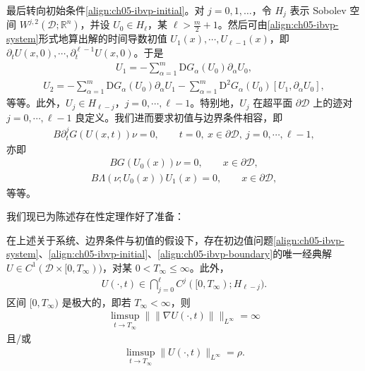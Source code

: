\documentclass[../../main.tex]{subfiles}
\begin{document}
最后转向初始条件\eqref{align:ch05-ibvp-initial}。对 $j=0,1,\ldots$，令 $H_{j}$ 表示 Sobolev 空间 $W^{j,2}(\mathscr{D};\mathbb{R}^{n})$，并设 $U_{0}\in H_{\ell}$，某 $\ell>\frac{m}{2}+1$。然后可由\eqref{align:ch05-ibvp-system}形式地算出解的时间导数初值 $U_{1}(x),\cdots,U_{\ell-1}(x)$，即 $\partial_{t}U(x,0),\cdots,\partial_{t}^{\ell-1}U(x,0)$。于是
\begin{align}
U_{1}=-\sum_{\alpha=1}^{m}\mathrm{D}G_{\alpha}(U_{0})\partial_{\alpha}U_{0},\label{align:ch05-U1}
\end{align}
\begin{align}
U_{2}=-\sum_{\alpha=1}^{m}\mathrm{D}G_{\alpha}(U_{0})\partial_{\alpha}U_{1}-\sum_{\alpha=1}^{m}\mathrm{D}^{2}G_{\alpha}(U_{0})[U_{1},\partial_{\alpha}U_{0}],\label{align:ch05-U2}
\end{align}
等等。此外，$U_{j}\in H_{\ell-j}$，$j=0,\cdots,\ell-1$。特别地，$U_{j}$ 在超平面 $\partial\mathscr{D}$ 上的迹对 $j=0,\cdots,\ell-1$ 良定义。我们进而要求初值与边界条件相容，即
\begin{align}
B\partial_{t}^{j}G(U(x,t))\nu=0,\qquad t=0,\ x\in\partial\mathscr{D},\ j=0,\cdots,\ell-1,\label{align:ch05-compatibility}
\end{align}
亦即
\begin{align}
BG(U_{0}(x))\nu=0,\qquad x\in\partial\mathscr{D},\label{align:ch05-compat0}
\end{align}
\begin{align}
B\Lambda(\nu;U_{0}(x))U_{1}(x)=0,\qquad x\in\partial\mathscr{D},\label{align:ch05-compat1}
\end{align}
等等。

我们现已为陈述存在性定理作好了准备：

\begin{theorem}\label{theorem:ch05-ibvp-existence}
在上述关于系统、边界条件与初值的假设下，存在初边值问题\eqref{align:ch05-ibvp-system}、\eqref{align:ch05-ibvp-initial}、\eqref{align:ch05-ibvp-boundary}的唯一经典解 $U\in C^{1}(\mathscr{D}\times[0,T_{\infty}))$，对某 $0<T_{\infty}\leqslant\infty$。此外，
\begin{align}
U(\cdot,t)\in\bigcap_{j=0}^{\ell}C^{j}([0,T_{\infty});H_{\ell-j}).\label{align:ch05-ibvp-regularity}
\end{align}
区间 $[0,T_{\infty})$ 是极大的，即若 $T_{\infty}<\infty$，则
\begin{align}
\limsup_{t\to T_{\infty}}\|\|\nabla U(\cdot,t)\|\|_{L^{\infty}}=\infty\label{align:ch05-ibvp-blowup1}
\end{align}
且/或
\begin{align}
\limsup_{t\to T_{\infty}}\|U(\cdot,t)\|_{L^{\infty}}=\rho.\label{align:ch05-ibvp-blowup2}
\end{align}
\end{theorem}
\end{document}
